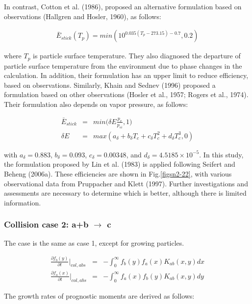 In contrast, Cotton et al. (1986), proposed an alternative formulation based on observations (Hallgren and Hosler, 1960), as follows:

\begin{eqnarray}
\bar{E}_{stick}(T_{p})=min(10^{0.035(T_{p}-273.15)-0.7},0.2)\label{sn186}
\end{eqnarray}

where $T_{p}$ is particle surface temperature. They also diagnosed the departure of particle surface temperature from the environment due to phase changes in the calculation. In addition, their formulation has an upper limit to reduce efficiency, based on observations. Similarly, Khain and Sednev (1996) proposed a formulation based on other observations (Hosler et al., 1957; Rogers et al., 1974). Their formulation also depends on vapor pressure, as follows:

\begin{eqnarray}
\bar{E}_{stick}&=&min\bigl(\delta E\frac{p_{v}}{p_{si}},1\bigr)\label{sn187}\\
\delta E&=&max(a_{\delta}+b_{\delta}T_{c}+c_{\delta}T_{c}^{2}+d_{\delta}T_{c}^{3},0)\label{sn188}
\end{eqnarray}

with $a_{\delta} = 0.883$, $b_{\delta} = 0.093$, $c_{\delta} = 0.00348$, and $d_{\delta} = 4.5185 \times 10^{-5}$. In this study, the formulation proposed by Lin et al. (1983) is applied following Seifert and Beheng (2006a). These efficiencies are shown in Fig.\ref{figsn2-22}, with various observational data from Pruppacher and Klett (1997). Further investigations and assessments are necessary to determine which is better, although there is limited information.


\subsubsection{Collision case 2: a+b $\rightarrow$ c}
 The case is the same as case 1, except for growing particles.

\begin{eqnarray}
\frac{\partial f_{b}(y)}{\partial t}\Bigr|_{col,abs}&=&-\int_{0}^{\infty}f_{b}(y)f_{a}(x)K_{ab}(x,y)dx\label{sn189}\\
\frac{\partial f_{a}(x)}{\partial t}\Bigr|_{col,abs}&=&-\int_{0}^{\infty}f_{a}(x)f_{b}(y)K_{ab}(x,y)dy\label{sn190}
\end{eqnarray}

The growth rates of prognostic moments are derived as follows:

